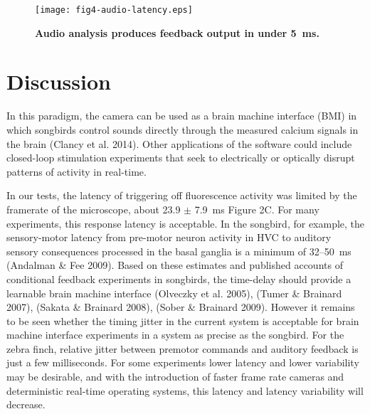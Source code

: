 \begin{figure}
\texttt{[image: fig4-audio-latency.eps]}
\caption[Latency for audio processing]{\textbf{Audio analysis 
produces feedback output in under 5~ms.} 
}
\label{fig:audio-latency}
\end{figure}

\section{Discussion}


 In this paradigm, the camera can be used as a brain machine interface
 (BMI) in which songbirds control sounds directly through the measured
 calcium signals in the brain (Clancy et al. 2014). Other applications
 of the software could include closed-loop stimulation experiments 
that seek to electrically or optically disrupt patterns of activity in
 real-time.

In our tests, the latency of triggering off fluorescence activity was 
limited by the framerate of the microscope, about 23.9 $\pm$ 7.9~ms 
Figure 2C. For many experiments, this response latency is acceptable. 
In the songbird, for example, the sensory-motor latency from pre-motor
 neuron activity in HVC to auditory sensory consequences processed in 
the basal ganglia is a minimum of 32--50~ms (Andalman \& Fee 2009). 
Based on these estimates and published accounts of conditional 
feedback experiments in songbirds, the time-delay should provide a 
learnable brain machine interface (Olveczky et al. 2005), (Tumer \& 
Brainard 2007), (Sakata \& Brainard 2008), (Sober \& Brainard 2009). 
However it remains to be seen whether the timing jitter in the current
 system is acceptable for brain machine interface experiments in a 
system as precise as the songbird. For the zebra finch, relative 
jitter between premotor commands and auditory feedback is just a few 
milliseconds. For some experiments lower latency and lower variability
 may be desirable, and with the introduction of faster frame rate 
cameras and deterministic real-time operating systems, this latency 
and latency variability will decrease.
